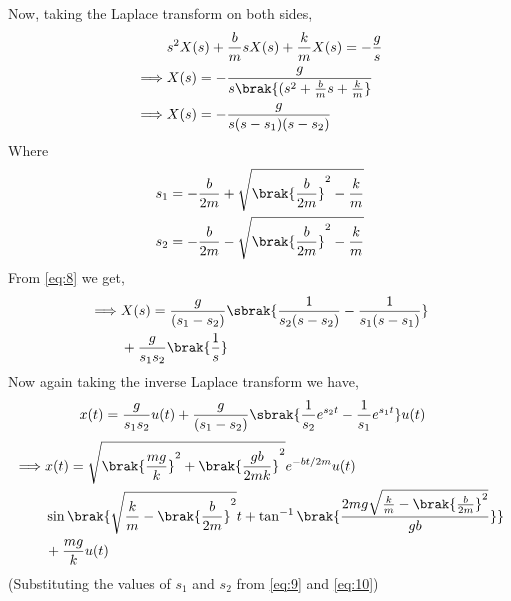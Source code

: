 \documentclass[journal,12pt,twocolumn]{IEEEtran}
\theoremstyle{remark}
\begin{document}
\begin{enumerate}
    Now, taking the Laplace transform on both sides,
    \begin{align}
        &s^2X(s)+\frac{b}{m}sX(s)+\frac{k}{m}X(s)=-\frac{g}{s} \label{eq:6}\\
        \implies &X(s)=-\frac{g}{s\brak{(s^2+\frac{b}{m}s+\frac{k}{m}}} \label{eq:7}\\
        \implies &X(s)=-\frac{g}{s(s-s_1)(s-s_2)} \label{eq:8}
    \end{align}
    Where
    \begin{align}
        &s_1=-\frac{b}{2m}+\sqrt{\brak{\frac{b}{2m}}^2-\frac{k}{m}} \label{eq:9}\\
        &s_2=-\frac{b}{2m}-\sqrt{\brak{\frac{b}{2m}}^2-\frac{k}{m}} \label{eq:10}
    \end{align}
    From \eqref{eq:8} we get,
    \begin{align}
        \begin{split}
            \implies &X(s)=\frac{g}{(s_1-s_2)}\sbrak{\frac{1}{s_2(s-s_2)}-\frac{1}{s_1(s-s_1)}} \\
            &+\frac{g}{s_1s_2}\brak{\frac{1}{s}} \label{eq:11}
        \end{split}
    \end{align}
    Now again taking the inverse Laplace transform we have,
    \begin{align}
        &x(t)=\frac{g}{s_1s_2}u(t)+\frac{g}{(s_1-s_2)}\sbrak{\frac{1}{s_2}e^{s_2t}-\frac{1}{s_1}e^{s_1t}}u(t)\label{eq:12}
    \end{align}
    \begin{align}
    \begin{split}
    \implies &x(t) =\sqrt{\brak{\frac{mg}{k}}^2 + \brak{\frac{gb}{2mk}}^2}e^{-bt/2m}u(t) \\
            &\sin{\brak{\sqrt{\frac{k}{m} - \brak{\frac{b}{2m}}^2}t + \tan^{-1}\brak{\frac{2mg\sqrt{\frac{k}{m} - \brak{\frac{b}{2m}}^2}}{gb}}}} \\
            &+ \frac{mg}{k}
        u(t) \label{eq:13}
\end{split}
\end{align}
    (Substituting the values of $s_1$ and $s_2$ from \eqref{eq:9} and \eqref{eq:10})


\end{enumerate}
\end{document}
